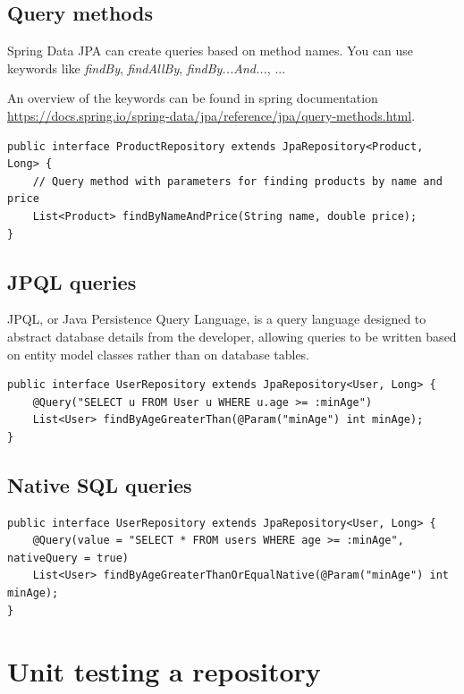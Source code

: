 \subsection{Query methods}

Spring Data JPA can create queries based on method names. You can use keywords like \textit{findBy}, \textit{findAllBy},
\textit{findBy...And...}, ...

An overview of the keywords can be found in spring documentation \url{https://docs.spring.io/spring-data/jpa/reference/jpa/query-methods.html}.

\begin{lstlisting}
public interface ProductRepository extends JpaRepository<Product, Long> {
    // Query method with parameters for finding products by name and price
    List<Product> findByNameAndPrice(String name, double price);
}
\end{lstlisting}

\subsection{JPQL queries}

JPQL, or Java Persistence Query Language, is a query language designed to abstract database details from the developer, allowing queries to be written based on entity model classes rather than on database tables.


\begin{lstlisting}
public interface UserRepository extends JpaRepository<User, Long> {
    @Query("SELECT u FROM User u WHERE u.age >= :minAge")
    List<User> findByAgeGreaterThan(@Param("minAge") int minAge);
}
\end{lstlisting}

\subsection{Native SQL queries}

\begin{lstlisting}
public interface UserRepository extends JpaRepository<User, Long> {
    @Query(value = "SELECT * FROM users WHERE age >= :minAge", nativeQuery = true)
    List<User> findByAgeGreaterThanOrEqualNative(@Param("minAge") int minAge);
}
\end{lstlisting}


\section{Unit testing a repository}

